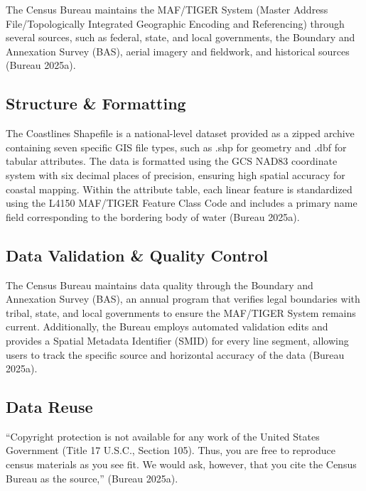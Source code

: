 \documentclass[
  letterpaper,
  DIV=11,
  numbers=noendperiod]{scrreprt}
\begin{document}
The Census Bureau maintains the MAF/TIGER System (Master Address
File/Topologically Integrated Geographic Encoding and Referencing)
through several sources, such as federal, state, and local governments,
the Boundary and Annexation Survey (BAS), aerial imagery and fieldwork,
and historical sources (Bureau 2025a).

\subsection{Structure \& Formatting}\label{structure-formatting-1}

The Coastlines Shapefile is a national-level dataset provided as a
zipped archive containing seven specific GIS file types, such as .shp
for geometry and .dbf for tabular attributes. The data is formatted
using the GCS NAD83 coordinate system with six decimal places of
precision, ensuring high spatial accuracy for coastal mapping. Within
the attribute table, each linear feature is standardized using the L4150
MAF/TIGER Feature Class Code and includes a primary name field
corresponding to the bordering body of water (Bureau 2025a).

\subsection{Data Validation \& Quality
Control}\label{data-validation-quality-control-1}

The Census Bureau maintains data quality through the Boundary and
Annexation Survey (BAS), an annual program that verifies legal
boundaries with tribal, state, and local governments to ensure the
MAF/TIGER System remains current. Additionally, the Bureau employs
automated validation edits and provides a Spatial Metadata Identifier
(SMID) for every line segment, allowing users to track the specific
source and horizontal accuracy of the data (Bureau 2025a).

\subsection{Data Reuse}\label{data-reuse-1}

``Copyright protection is not available for any work of the United
States Government (Title 17 U.S.C., Section 105). Thus, you are free to
reproduce census materials as you see fit. We would ask, however, that
you cite the Census Bureau as the source,'' (Bureau 2025a).
\end{document}

